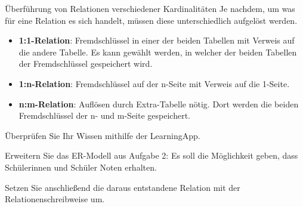 \documentclass[11pt, a4paper, oneside]{article}
\begin{document}
	\begin{hint}{Überführung von Relationen verschiedener Kardinalitäten}
		Je nachdem, um was für eine Relation es sich handelt, müssen diese unterschiedlich aufgelöst werden.
	
		\begin{itemize}
			\item \textbf{1:1-Relation}: Fremdschlüssel in einer der beiden Tabellen mit Verweis auf die andere Tabelle.
			Es kann gewählt werden, in welcher der beiden Tabellen der Fremdschlüssel gespeichert wird.
			\item \textbf{1:n-Relation}: Fremdschlüssel auf der n-Seite mit Verweis auf die 1-Seite.
			\item \textbf{n:m-Relation}: Auflösen durch Extra-Tabelle nötig.
			Dort werden die beiden Fremdschlüssel der n- und m-Seite gespeichert.
		\end{itemize}
	\end{hint}
	
	
	\begin{minipage}[t]{.75\textwidth}
		\vspace{0pt}
		Überprüfen Sie Ihr Wissen mithilfe der LearningApp.
	\end{minipage}
	\begin{minipage}[t]{.25\textwidth}
		\vspace{0pt}
	\end{minipage}
	
	
	
	Erweitern Sie das ER-Modell aus Aufgabe 2:
	Es soll die Möglichkeit geben, dass Schülerinnen und Schüler Noten erhalten.
	
	Setzen Sie anschließend die daraus entstandene Relation mit der Relationenschreibweise um.
\end{document}
